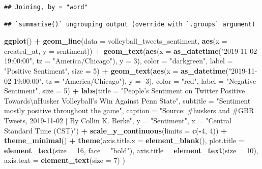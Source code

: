 \documentclass[
]{book}
\newenvironment{Shaded}{\begin{snugshade}}{\end{snugshade}}
\newcommand{\CharTok}[1]{\textcolor[rgb]{0.31,0.60,0.02}{#1}}
\newcommand{\DataTypeTok}[1]{\textcolor[rgb]{0.13,0.29,0.53}{#1}}
\newcommand{\DecValTok}[1]{\textcolor[rgb]{0.00,0.00,0.81}{#1}}
\newcommand{\KeywordTok}[1]{\textcolor[rgb]{0.13,0.29,0.53}{\textbf{#1}}}
\newcommand{\NormalTok}[1]{#1}
\newcommand{\OperatorTok}[1]{\textcolor[rgb]{0.81,0.36,0.00}{\textbf{#1}}}
\newcommand{\StringTok}[1]{\textcolor[rgb]{0.31,0.60,0.02}{#1}}
\begin{document}
\begin{verbatim}
## Joining, by = "word"
\end{verbatim}

\begin{verbatim}
## `summarise()` ungrouping output (override with `.groups` argument)
\end{verbatim}

\begin{Shaded}
\begin{Highlighting}[]
\KeywordTok{ggplot}\NormalTok{() }\OperatorTok{+}
\StringTok{  }\KeywordTok{geom_line}\NormalTok{(}\DataTypeTok{data =}\NormalTok{ volleyball_tweets_sentiment, }\KeywordTok{aes}\NormalTok{(}\DataTypeTok{x =}\NormalTok{ created_at, }\DataTypeTok{y =}\NormalTok{ sentiment)) }\OperatorTok{+}
\StringTok{  }\KeywordTok{geom_text}\NormalTok{(}\KeywordTok{aes}\NormalTok{(}\DataTypeTok{x =} \KeywordTok{as_datetime}\NormalTok{(}\StringTok{"2019-11-02 19:00:00"}\NormalTok{, }\DataTypeTok{tz =} \StringTok{"America/Chicago"}\NormalTok{), }\DataTypeTok{y =} \DecValTok{3}\NormalTok{), }\DataTypeTok{color =} \StringTok{"darkgreen"}\NormalTok{, }\DataTypeTok{label =} \StringTok{"Positive Sentiment"}\NormalTok{, }\DataTypeTok{size =} \DecValTok{5}\NormalTok{) }\OperatorTok{+}
\StringTok{  }\KeywordTok{geom_text}\NormalTok{(}\KeywordTok{aes}\NormalTok{(}\DataTypeTok{x =} \KeywordTok{as_datetime}\NormalTok{(}\StringTok{"2019-11-02 19:00:00"}\NormalTok{, }\DataTypeTok{tz =} \StringTok{"America/Chicago"}\NormalTok{), }\DataTypeTok{y =} \DecValTok{-3}\NormalTok{), }\DataTypeTok{color =} \StringTok{"red"}\NormalTok{, }\DataTypeTok{label =} \StringTok{"Negative Sentiment"}\NormalTok{, }\DataTypeTok{size =} \DecValTok{5}\NormalTok{) }\OperatorTok{+}
\StringTok{  }\KeywordTok{labs}\NormalTok{(}\DataTypeTok{title =} \StringTok{"People's Sentiment on Twitter Positive Towards}\CharTok{\textbackslash{}n}\StringTok{Husker Volleyball's Win Against Penn State"}\NormalTok{,}
       \DataTypeTok{subtitle =} \StringTok{"Sentiment mostly positive throughout the game"}\NormalTok{,}
       \DataTypeTok{caption =} \StringTok{"Source: #huskers and #GBR Tweets, 2019-11-02 | By Collin K. Berke"}\NormalTok{,}
       \DataTypeTok{y =} \StringTok{"Sentiment"}\NormalTok{,}
       \DataTypeTok{x =} \StringTok{"Central Standard Time (CST)"}\NormalTok{) }\OperatorTok{+}\StringTok{ }
\StringTok{  }\KeywordTok{scale_y_continuous}\NormalTok{(}\DataTypeTok{limits =} \KeywordTok{c}\NormalTok{(}\OperatorTok{-}\DecValTok{4}\NormalTok{, }\DecValTok{4}\NormalTok{)) }\OperatorTok{+}
\StringTok{  }\KeywordTok{theme_minimal}\NormalTok{() }\OperatorTok{+}
\StringTok{  }\KeywordTok{theme}\NormalTok{(}\DataTypeTok{axis.title.x =} \KeywordTok{element_blank}\NormalTok{(),}
        \DataTypeTok{plot.title =} \KeywordTok{element_text}\NormalTok{(}\DataTypeTok{size =} \DecValTok{16}\NormalTok{, }\DataTypeTok{face =} \StringTok{"bold"}\NormalTok{),}
    \DataTypeTok{axis.title =} \KeywordTok{element_text}\NormalTok{(}\DataTypeTok{size =} \DecValTok{10}\NormalTok{),}
    \DataTypeTok{axis.text =} \KeywordTok{element_text}\NormalTok{(}\DataTypeTok{size =} \DecValTok{7}\NormalTok{)}
\NormalTok{        )}
\end{Highlighting}
\end{Shaded}
\end{document}

